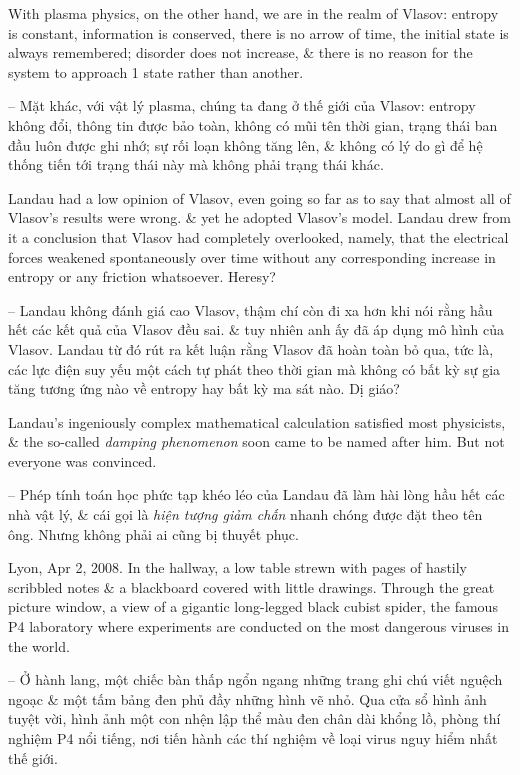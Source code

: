 \documentclass{article}
\begin{document}
\begin{enumerate}
	With plasma physics, on the other hand, we are in the realm of Vlasov: entropy is constant, information is conserved, there is no arrow of time, the initial state is always remembered; disorder does not increase, \& there is no reason for the system to approach 1 state rather than another.
	
	-- Mặt khác, với vật lý plasma, chúng ta đang ở thế giới của Vlasov: entropy không đổi, thông tin được bảo toàn, không có mũi tên thời gian, trạng thái ban đầu luôn được ghi nhớ; sự rối loạn không tăng lên, \& không có lý do gì để hệ thống tiến tới trạng thái này mà không phải trạng thái khác.
	
	{\sc Landau} had a low opinion of {\sc Vlasov}, even going so far as to say that almost all of {\sc Vlasov}'s results were wrong. \& yet he adopted {\sc Vlasov}'s model. {\sc Landau} drew from it a conclusion that {\sc Vlasov} had completely overlooked, namely, that the electrical forces weakened spontaneously over time without any corresponding increase in entropy or any friction whatsoever. Heresy?
	
	-- {\sc Landau} không đánh giá cao {\sc Vlasov}, thậm chí còn đi xa hơn khi nói rằng hầu hết các kết quả của {\sc Vlasov} đều sai. \& tuy nhiên anh ấy đã áp dụng mô hình của {\sc Vlasov}. {\sc Landau} từ đó rút ra kết luận rằng {\sc Vlasov} đã hoàn toàn bỏ qua, tức là, các lực điện suy yếu một cách tự phát theo thời gian mà không có bất kỳ sự gia tăng tương ứng nào về entropy hay bất kỳ ma sát nào. Dị giáo?
	
	{\sc Landau}'s ingeniously complex mathematical calculation satisfied most physicists, \& the so-called {\it damping phenomenon} soon came to be named after him. But not everyone was convinced.
	
	-- Phép tính toán học phức tạp khéo léo của {\sc Landau} đã làm hài lòng hầu hết các nhà vật lý, \& cái gọi là {\it hiện tượng giảm chấn} nhanh chóng được đặt theo tên ông. Nhưng không phải ai cũng bị thuyết phục.
	
	 Lyon, Apr 2, 2008. In the hallway, a low table strewn with pages of hastily scribbled notes \& a blackboard covered with little drawings. Through the great picture window, a view of a gigantic long-legged black cubist spider, the famous P4 laboratory where experiments are conducted on the most dangerous viruses in the world.
	
	-- Ở hành lang, một chiếc bàn thấp ngổn ngang những trang ghi chú viết nguệch ngoạc \& một tấm bảng đen phủ đầy những hình vẽ nhỏ. Qua cửa sổ hình ảnh tuyệt vời, hình ảnh một con nhện lập thể màu đen chân dài khổng lồ, phòng thí nghiệm P4 nổi tiếng, nơi tiến hành các thí nghiệm về loại virus nguy hiểm nhất thế giới.
	

\end{enumerate}
\end{document}
